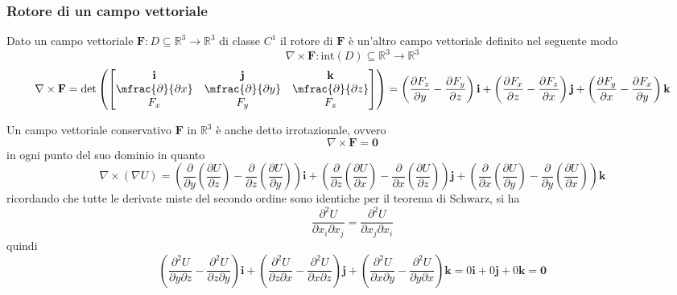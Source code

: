             \subsubsection{Rotore di un campo vettoriale}
                Dato un campo vettoriale $\mathbf{F}: D \subseteq \mathbb{R}^{3} \rightarrow \mathbb{R}^{3}$ di classe $C^{1}$ il rotore di $\mathbf{F}$ è un'altro campo vettoriale definito nel seguente modo
                \[
                    \nabla \times \mathbf{F}: \text{int}(D) \subseteq \mathbb{R}^{3} \rightarrow \mathbb{R}^{3}
                \]
                \[
                    \nabla \times \mathbf{F} = \det\left( \begin{bmatrix}
                        \mathbf{i} & \mathbf{j} & \mathbf{k} \\
                        \mfrac{\partial}{\partial x} & \mfrac{\partial}{\partial y} & \mfrac{\partial}{\partial z} \\
                        F_{x} & F_{y} & F_{z}
                    \end{bmatrix}\right)
                    = \left(\frac{\partial F_{z}}{\partial y} - \frac{\partial F_{y}}{\partial z}\right)\mathbf{i} + \left( \frac{\partial F_{x}}{\partial z} - \frac{\partial F_{z}}{\partial x}\right) \mathbf{j} + \left( \frac{\partial F_{y}}{\partial x} - \frac{\partial F_{x}}{\partial y}\right) \mathbf{k}
                \]

                Un campo vettoriale conservativo $\mathbf{F}$ in $\mathbb{R}^{3}$ è anche detto irrotazionale, ovvero
                \[
                    \nabla \times \mathbf{F} = \mathbf{0}
                \]
                in ogni punto del suo dominio in quanto
                \[
                    \nabla \times (\nabla U) = \left( \frac{\partial}{\partial y} \left( \frac{\partial U}{\partial z} \right) - \frac{\partial}{\partial z} \left( \frac{\partial U}{\partial y}\right) \right) \mathbf{i} + \left( \frac{\partial}{\partial z} \left( \frac{\partial U}{\partial x} \right) - \frac{\partial}{\partial x} \left( \frac{\partial U}{\partial z}\right) \right) \mathbf{j} + \left( \frac{\partial}{\partial x} \left( \frac{\partial U}{\partial y} \right) - \frac{\partial}{\partial y} \left( \frac{\partial U}{\partial x}\right) \right) \mathbf{k}
                \]
                ricordando che tutte le derivate miste del secondo ordine sono identiche per il teorema di Schwarz, si ha
                \[
                    \frac{\partial^{2} U}{\partial x_{i} \partial x_{j}} = \frac{\partial^{2} U}{\partial x_{j} \partial x_{i}}
                \]
                quindi
                \[
                    \left( \frac{\partial^{2} U}{\partial y \partial z} - \frac{\partial^{2} U}{\partial z \partial y} \right) \mathbf{i} + \left( \frac{\partial^{2} U}{\partial z \partial x} -  \frac{\partial^{2} U}{\partial x \partial z} \right) \mathbf{j} + \left( \frac{\partial^{2} U}{\partial x \partial y} -  \frac{\partial^{2} U}{\partial y \partial x} \right) \mathbf{k} = 0 \mathbf{i} + 0 \mathbf{j} + 0 \mathbf{k} = \mathbf{0}
                \]

